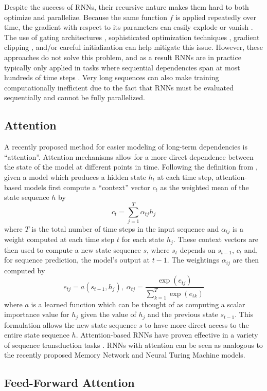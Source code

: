 \documentclass{article} %
\begin{document}
Despite the success of RNNs, their recursive nature makes them hard to both optimize and parallelize.
Because the same function $f$ is applied repeatedly over time, the gradient with respect to its parameters can easily explode or vanish \cite{}.
The use of gating architectures \cite{}, sophisticated optimization techniques \cite{}, gradient clipping \cite{}, and/or careful initialization \cite{} can help mitigate this issue.
However, these approaches do not solve this problem, and as a result RNNs are in practice typically only applied in tasks where sequential dependencies span at most hundreds of time steps \cite{}.
Very long sequences can also make training computationally inefficient due to the fact that RNNs must be evaluated sequentially and cannot be fully parallelized.

\subsection{Attention}

A recently proposed method for easier modeling of long-term dependencies is ``attention''.
Attention mechanisms allow for a more direct dependence between the state of the model at different points in time.
Following the definition from \cite{}, given a model which produces a hidden state $h_t$ at each time step, attention-based models first compute a ``context'' vector $c_t$ as the weighted mean of the state sequence $h$ by
$$
c_t = \sum_{j = 1}^T \alpha_{tj} h_j
$$
where $T$ is the total number of time steps in the input sequence and $\alpha_{tj}$ is a weight computed at each time step $t$ for each state $h_j$.
These context vectors are then used to compute a new state sequence $s$, where $s_t$ depends on $s_{t - 1}$, $c_t$ and, for sequence prediction, the model's output at $t - 1$.
The weightings $\alpha_{ij}$ are then computed by
$$
e_{tj} = a(s_{t - 1}, h_j),\; \alpha_{tj} = \frac{\exp(e_{tj})}{\sum_{k = 1}^T \exp(e_{tk})}
$$
where $a$ is a learned function which can be thought of as computing a scalar importance value for $h_j$ given the value of $h_j$ and the previous state $s_{t - 1}$.
This formulation allows the new state sequence $s$ to have more direct access to the entire state sequence $h$.
Attention-based RNNs have proven effective in a variety of sequence transduction tasks \cite{}.
RNNs with attention can be seen as analogous to the recently proposed Memory Network \cite{} and Neural Turing Machine \cite{} models.

\subsection{Feed-Forward Attention}
\end{document}

